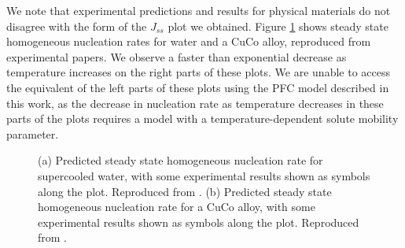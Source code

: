 We note that experimental predictions and results for physical materials do not disagree with the form of the $J_{ss}$ plot we obtained. Figure \ref{fig:res_Jss_examples} shows steady state homogeneous nucleation rates for water and a CuCo alloy, reproduced from experimental papers. We observe a faster than exponential decrease as temperature increases on the right parts of these plots. We are unable to access the equivalent of the left parts of these plots using the PFC model described in this work, as the decrease in nucleation rate as temperature decreases in these parts of the plots requires a model with a temperature-dependent solute mobility parameter.

\begin{figure}[!h]
	\centering
	\caption{(a) Predicted steady state homogeneous nucleation rate for supercooled water, with some experimental results shown as symbols along the plot. Reproduced from \cite{jeffery97}. (b) Predicted steady state homogeneous nucleation rate for a CuCo alloy, with some experimental results shown as symbols along the plot. Reproduced from \cite{legoues84}.}\label{fig:res_Jss_examples}
\end{figure}

